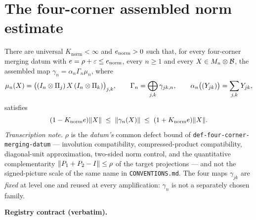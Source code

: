 \section{The four-corner assembled norm estimate}\label{sec:extcb-four-corner-norm}

\begin{lemma}\label{lem:extcb-four-corner-norm}
There are universal $K_{\mathrm{norm}}<\infty$ and $e_{\mathrm{norm}}>0$ such that,
for every four-corner merging datum with $e=\rho+\varepsilon\le e_{\mathrm{norm}}$, every
$n\ge1$ and every $X\in M_{n}\otimes \mathcal B$, the assembled map
$\gamma_n=\alpha_n\Gamma_n\mu_n$, where
\[
  \mu_n(X)=\bigl((I_{n}\otimes \Pi_j)\,X\,(I_{n}\otimes \Pi_k)\bigr)_{j,k},
  \qquad
  \Gamma_n=\bigoplus_{j,k}\gamma_{jk,n},
  \qquad
  \alpha_n\bigl((Y_{jk})\bigr)=\sum_{j,k}Y_{jk},
\]
satisfies
\begin{equation}\label{eq:fcn-main}
  (1-K_{\mathrm{norm}}e)\lVert X\rVert\;\le\;\lVert \gamma_n(X)\rVert\;\le\;(1+K_{\mathrm{norm}}e)\lVert X\rVert.
\end{equation}
\emph{Transcription note.} $\rho$ is the \emph{datum's} common defect bound of
\texttt{def-four-corner-merging-datum} --- involution compatibility, compressed-product
compatibility, diagonal-unit approximation, two-sided norm control, and the quantitative
complementarity $\lVert P_1+P_2-I\rVert\le\rho$ of the target projections --- and not the
signed-picture scale of the same name in \texttt{CONVENTIONS.md}. The four maps
$\gamma_{jk}$ are \emph{fixed} at level one and reused at every amplification: $\gamma_n$
is not a separately chosen family.
\end{lemma}

\noindent\textbf{Registry contract (verbatim).}

